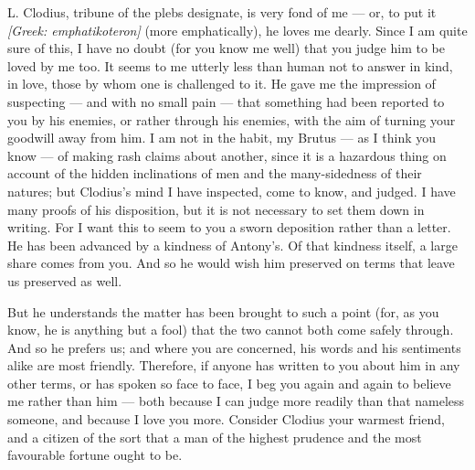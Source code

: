 

 L. Clodius, tribune of the plebs designate, is very fond of me --- or, to put it \textit{[Greek: emphatikoteron]} (more emphatically), he loves me dearly. Since I am quite sure of this, I have no doubt (for you know me well) that you judge him to be loved by me too. It seems to me utterly less than human not to answer in kind, in love, those by whom one is challenged to it. He gave me the impression of suspecting --- and with no small pain --- that something had been reported to you by his enemies, or rather through his enemies, with the aim of turning your goodwill away from him. I am not in the habit, my Brutus --- as I think you know --- of making rash claims about another, since it is a hazardous thing on account of the hidden inclinations of men and the many-sidedness of their natures; but Clodius's mind I have inspected, come to know, and judged. I have many proofs of his disposition, but it is not necessary to set them down in writing. For I want this to seem to you a sworn deposition rather than a letter. He has been advanced by a kindness of Antony's. Of that kindness itself, a large share comes from you. And so he would wish him preserved on terms that leave us preserved as well.

 But he understands the matter has been brought to such a point (for, as you know, he is anything but a fool) that the two cannot both come safely through. And so he prefers us; and where you are concerned, his words and his sentiments alike are most friendly. Therefore, if anyone has written to you about him in any other terms, or has spoken so face to face, I beg you again and again to believe me rather than him --- both because I can judge more readily than that nameless someone, and because I love you more. Consider Clodius your warmest friend, and a citizen of the sort that a man of the highest prudence and the most favourable fortune ought to be.
